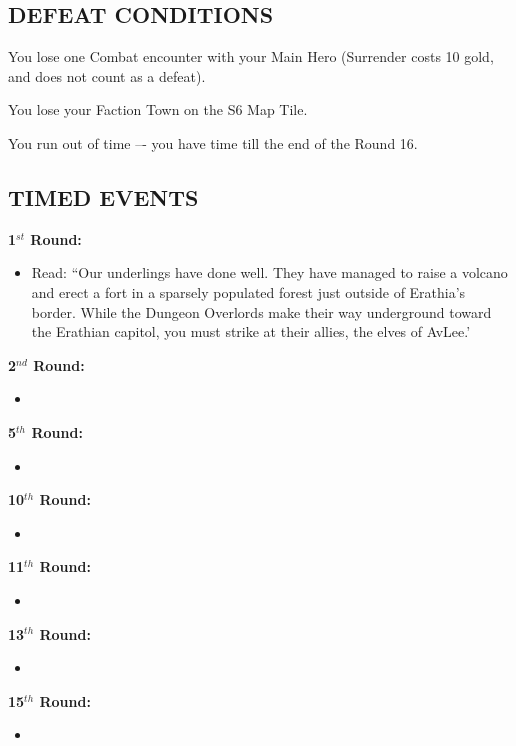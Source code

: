 \begin{multicols*}{2}
\subsection*{\MakeUppercase{Defeat Conditions}}

You lose one Combat encounter with your Main Hero (Surrender costs 10 gold, and does not count as a defeat).

You lose your Faction Town on the S6 Map Tile.

You run out of time –- you have time till the end of the Round 16.

\subsection*{\MakeUppercase{Timed Events}}

\textbf{1$^{st}$ Round:}
\begin{itemize}
  \item Read: ``Our underlings have done well. They have managed to raise a volcano
    and erect a fort in a sparsely populated forest just outside of Erathia's border.
    While the Dungeon Overlords make their way underground toward the Erathian capitol,
    you must strike at their allies, the elves of AvLee.'
\end{itemize}

\textbf{2$^{nd}$ Round:}
\begin{itemize}
  \item 
\end{itemize}

\textbf{5$^{th}$ Round:}
\begin{itemize}
  \item 
\end{itemize}

\textbf{10$^{th}$ Round:}
\begin{itemize}
  \item 
\end{itemize}

\textbf{11$^{th}$ Round:}
\begin{itemize}
  \item 
\end{itemize}

\textbf{13$^{th}$ Round:}
\begin{itemize}
  \item 
\end{itemize}

\textbf{15$^{th}$ Round:}
\begin{itemize}
  \item 
\end{itemize}


\end{multicols*}
